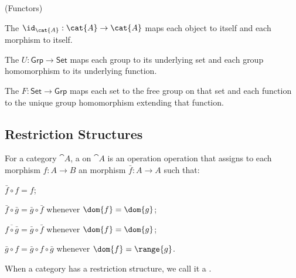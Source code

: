 \step
\begin{examples} (Functors)
  \begin{enumarabic}
    \item The  $\id_{\cat{A}} : \cat{A} \to \cat{A}$
      maps each object to itself and each morphism to itself.
    \item The  $U : \mathsf{Grp} \to \mathsf{Set}$
      maps each group to its underlying set and each group homomorphism
      to its underlying function.
    \item The  $F : \mathsf{Set} \to \mathsf{Grp}$
      maps each set to the free group on that set and each function
      to the unique group homomorphism extending that function.
  \end{enumarabic}
\end{examples}

\subsection{Restriction Structures}
\begin{definition}
  For a category $\cat{A}$, a 
  on $\cat{A}$ is an operation operation that assigns to
  each morphism $f : A \to B$
  an morphism $\bar{f} : A \to A$ such that:
  \begin{enumarabic}
    \item $\bar{f} \circ f = f$;
    \item $\bar{f} \circ \bar{g} = \bar{g} \circ \bar{f}$
      whenever $\dom{f} = \dom{g}$;
    \item $\overline{f \circ \bar{g}} = \bar{g} \circ \bar{f}$
      whenever $\dom{f} = \dom{g}$;
    \item $\bar{g} \circ f = \bar{g} \circ f \circ \bar{g}$
      whenever $\dom{f} = \range{g}$.
  \end{enumarabic}
\end{definition}

When a category has a restriction structure, we call it a .



